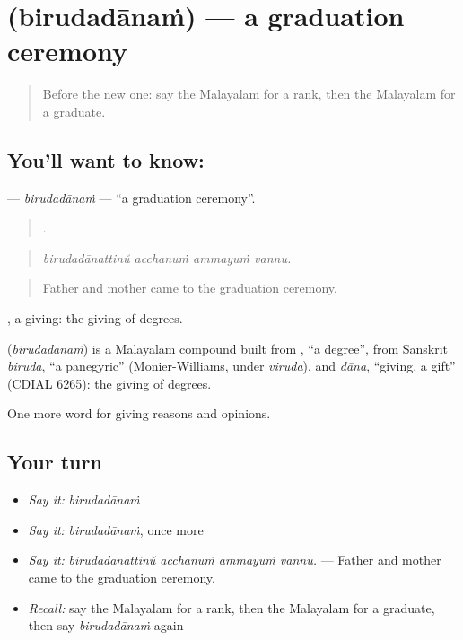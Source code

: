 \section[\texorpdfstring{\ml{ബിരുദദാനം} (birudadānaṁ)}{ബിരുദദാനം (birudadānaṁ)}]{ (birudadānaṁ) — a graduation ceremony}

\label{lesson:ML-C435-birudadanam}



\begin{quote}
Before the new one: say the Malayalam for a rank, then the Malayalam for a graduate.
\end{quote}

\subsection*{You'll want to know: }
\textbf{} — \emph{birudadānaṁ} — \textquotedblleft{}a graduation ceremony\textquotedblright{}.

\begin{quote}
   .
\end{quote}

\begin{quote}
\emph{birudadānattinŭ acchanuṁ ammayuṁ vannu.}
\end{quote}

\begin{quote}
Father and mother came to the graduation ceremony.
\end{quote}

, a giving: the giving of degrees.

\begin{cousinweb}
\textbf{} (\emph{birudadānaṁ}) is a Malayalam compound built from , \textquotedblleft{}a degree\textquotedblright{}, from Sanskrit \emph{biruda}, \textquotedblleft{}a panegyric\textquotedblright{} (Monier-Williams, under \emph{viruda}), and \emph{dāna}, \textquotedblleft{}giving, a gift\textquotedblright{} (CDIAL 6265): the giving of degrees.
\end{cousinweb}

\begin{grammarlens}[title={What you've built}]
One more word for giving reasons and opinions.
\end{grammarlens}

\subsection*{Your turn}
\begin{itemize}
\raggedright
  \item \emph{Say it:} \emph{birudadānaṁ}
  \item \emph{Say it:} \emph{birudadānaṁ}, once more
  \item \emph{Say it:} \emph{birudadānattinŭ acchanuṁ ammayuṁ vannu.} — Father and mother came to the graduation ceremony.
  \item \emph{Recall:} say the Malayalam for a rank, then the Malayalam for a graduate, then say \emph{birudadānaṁ} again
\end{itemize}


